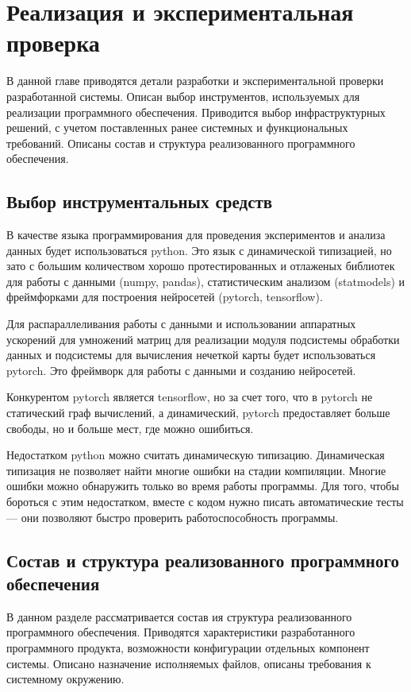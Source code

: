 \chapter{Реализация и экспериментальная проверка}

\begin{annotation}
	В данной главе приводятся детали разработки и экспериментальной проверки
	разработанной системы. Описан выбор инструментов, используемых для реализации
	программного обеспечения. Приводится выбор инфраструктурных решений,
	с учетом поставленных ранее системных и функциональных требований.
	Описаны состав и структура реализованного программного обеспечения.
\end{annotation}




\section{Выбор инструментальных средств}

В качестве языка программирования для проведения экспериментов и анализа данных
будет использоваться python. Это язык с динамической типизацией, но зато с
большим количеством хорошо протестированных и отлаженых библиотек для работы
с данными (numpy, pandas), статистическим анализом (statmodels) и фреймфорками для построения нейросетей (pytorch, tensorflow).

Для распараллеливания работы с данными и использовании аппаратных ускорений для умножений матриц
для реализации модуля подсистемы обработки данных и подсистемы для вычисления нечеткой карты
будет использоваться pytorch. Это фреймворк для работы с данными и созданию нейросетей.

Конкурентом pytorch является tensorflow, но за счет того, что в pytorch не статический
граф вычислений, а динамический, pytorch предоставляет больше свободы, но и больше мест,
где можно ошибиться.

Недостатком python можно считать динамическую типизацию. Динамическая типизация не позволяет
найти многие ошибки на стадии компиляции. Многие ошибки можно обнаружить только во время
работы программы. Для того, чтобы бороться с этим недостатком, вместе с кодом нужно писать
автоматические тесты --- они позволяют быстро проверить работоспособность программы.

\section{Состав и структура реализованного программного обеспечения}
\begin{annotation}
	В данном разделе рассматривается состав ия структура реализованного программного обеспечения.
	Приводятся характеристики разработанного программного продукта, возможности конфигурации отдельных
	компонент системы. Описано назначение исполняемых файлов, описаны требования к системному окружению.
\end{annotation}

